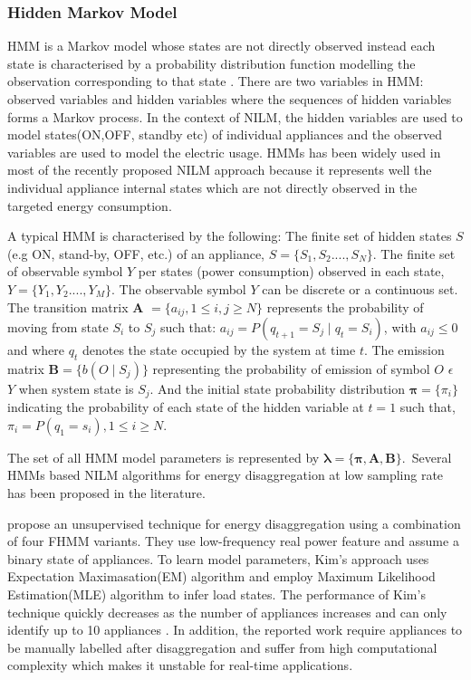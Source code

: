 \subsubsection{Hidden Markov Model}
HMM is a Markov model whose states are not directly observed instead each state is characterised by a probability distribution function modelling the observation corresponding to that state \citep{Kim2011,Rabiner1989a}. There are two variables in HMM: observed variables and hidden variables where the sequences of hidden variables forms a Markov process. In the context of NILM, the hidden variables are used to model states(ON,OFF, standby etc) of individual appliances and the observed variables are used to model the electric usage. HMMs has been widely used in most of the recently proposed NILM approach because it represents well the individual appliance internal states which are not directly observed in the targeted energy consumption.

A typical HMM is characterised by the following: The finite set of hidden states $S$ (e.g ON, stand-by, OFF, etc.) of an appliance, $S = \{S_1, S_2....,S_N\}$. The finite set of observable symbol $Y$ per states (power consumption) observed in each state, $Y = \{Y_1, Y_2....,Y_M\}$. The observable symbol $Y$ can be discrete or a continuous set. The transition matrix \textbf{A} $=\{a_{ij},1\leq i,j \geq N\} $ represents the probability of moving from state $S_i$ to $S_j$ such that:
$a_{ij} = P(q_{t+1} =S_j \mid q_t=S_i)$, with $a_{ij} \leq 0$ and where $q_t$ denotes the state occupied by the system at time $t$. The emission matrix \textbf{B}$ =\{b(O \mid S_j)\} $ representing the probability of emission of symbol $O$ $\epsilon$ $ Y$ when system state is $S_j$. And the initial state probability distribution $\bm{\pi} = \{\pi_i \}$ indicating the probability of each state of the hidden variable  at $t = 1$ such that, $\pi _i = P(q_1 = s_i), 1 \leq i \geq N$. 

The set of all HMM model parameters is represented by 
$\bm{\lambda =\{\pi, A, B \}}$.~Several HMMs based NILM algorithms for energy disaggregation at low sampling rate has been proposed in the literature.


\cite{Kim2011} propose  an unsupervised technique for energy disaggregation using a combination of four FHMM variants. They use low-frequency real power feature and assume a binary state of appliances. To learn model parameters, Kim's approach uses Expectation Maximasation(EM) algorithm  and employ Maximum Likelihood Estimation(MLE) algorithm to infer load states. The performance of Kim's technique quickly decreases as the number of appliances increases and can only identify up to 10 appliances \citep{Parson2014c}. In addition, the reported work require appliances to be manually labelled after disaggregation and suffer from high computational complexity which makes it unstable for real-time applications.



